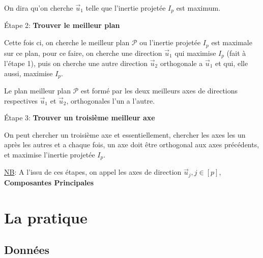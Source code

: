 \documentclass{article}
\begin{document}
On dira qu’on cherche $\vec{u}_1$ telle que l’inertie projetée $I_p$ est maximum.

\begin{flushleft}
Étape 2: \textbf{Trouver le meilleur plan}
\end{flushleft}

Cette fois ci, on cherche le meilleur plan $\mathcal{P}$ ou l'inertie projetée $I_p$ est maximale sur ce plan, pour ce faire, on cherche une direction $\vec{u}_1$ qui maximise $I_p$ (fait à l'étape 1), puis on cherche une autre direction $\vec{u}_2$ orthogonale a $\vec{u}_1$ et qui, elle aussi, maximise $I_p$.
\newline

Le plan meilleur plan $\mathcal{P}$ est formé par les deux meilleurs axes de directions respectives $\vec{u}_1$ et $\vec{u}_2$, orthogonales l'un a l'autre.

\begin{flushleft}
Étape 3: \textbf{Trouver un troisième meilleur axe}
\end{flushleft}

On peut chercher un troisième axe et essentiellement, chercher les axes les un après les autres et a chaque fois, un axe doit être orthogonal aux axes précédents, et maximise l'inertie projetée $I_p$.
\newline

\begin{flushleft}
\underline{NB}: A l'issu de ces étapes, on appel les axes de direction $\vec{u}_j,j \in [p]$, \textbf{Composantes Principales}
\end{flushleft}

\newpage

\section{La pratique}

\subsection{Données}
\end{document}
